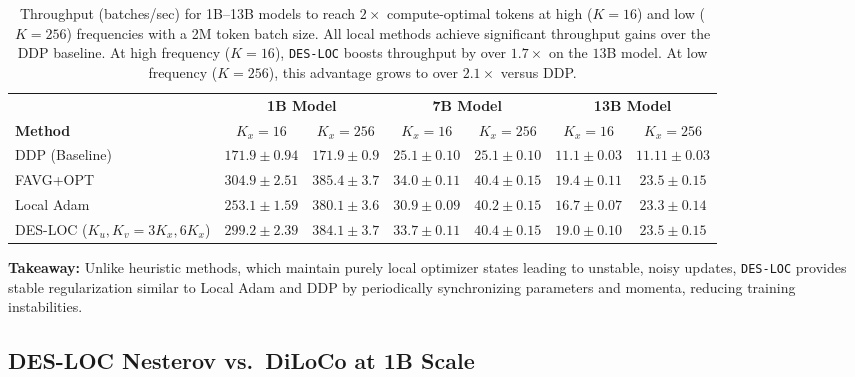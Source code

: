 \begin{table}[ht]
\centering
\caption{Throughput (batches/sec) for 1B--13B models to reach $2\times$ compute-optimal tokens at high ($K=16$) and low ($K=256$) frequencies with a 2M token batch size. All local methods achieve significant throughput gains over the DDP baseline. At high frequency ($K=16$), \texttt{DES-LOC} boosts throughput by over $1.7\times$ on the $13$B model. At low frequency ($K=256$), this advantage grows to over $2.1\times$ versus DDP.}
\label{tab:5}
\begin{tabular}{l c c c c c c}
\hline \hline
 & \multicolumn{2}{c}{\textbf{1B Model}} & \multicolumn{2}{c}{\textbf{7B Model}} & \multicolumn{2}{c}{\textbf{13B Model}} \\
\cline{2-7}
\textbf{Method} & $K_x\!=\!16$ & $K_x\!=\!256$ & $K_x\!=\!16$ & $K_x\!=\!256$ & $K_x\!=\!16$ & $K_x\!=\!256$ \\
\hline
DDP (Baseline) & $171.9 \pm 0.94$ & $171.9 \pm 0.9$ & $25.1 \pm 0.10$ & $25.1 \pm 0.10$ & $11.1 \pm 0.03$ & $11.11 \pm 0.03$ \\
\hline
FAVG+OPT & $304.9 \pm 2.51$ & $385.4 \pm 3.7$ & $34.0 \pm 0.11$ & $40.4 \pm 0.15$ & $19.4 \pm 0.11$ & $23.5 \pm 0.15$ \\
Local Adam & $253.1 \pm 1.59$ & $380.1 \pm 3.6$ & $30.9 \pm 0.09$ & $40.2 \pm 0.15$ & $16.7 \pm 0.07$ & $23.3 \pm 0.14$ \\
DES-LOC ($K_u,K_v\!=\!3K_x,6K_x$) & $299.2 \pm 2.39$ & $384.1 \pm 3.7$ & $33.7 \pm 0.11$ & $40.4 \pm 0.15$ & $19.0 \pm 0.10$ & $23.5 \pm 0.15$ \\
\hline \hline
\end{tabular}
\end{table}

\textbf{Takeaway:} Unlike heuristic methods, which maintain purely local optimizer states leading to unstable, noisy updates, \texttt{DES-LOC} provides stable regularization similar to Local Adam and DDP by periodically synchronizing parameters and momenta, reducing training instabilities.

\subsection{DES-LOC Nesterov vs.\ DiLoCo at 1B Scale}
\label{sec:b5_nesterov_diloco}

